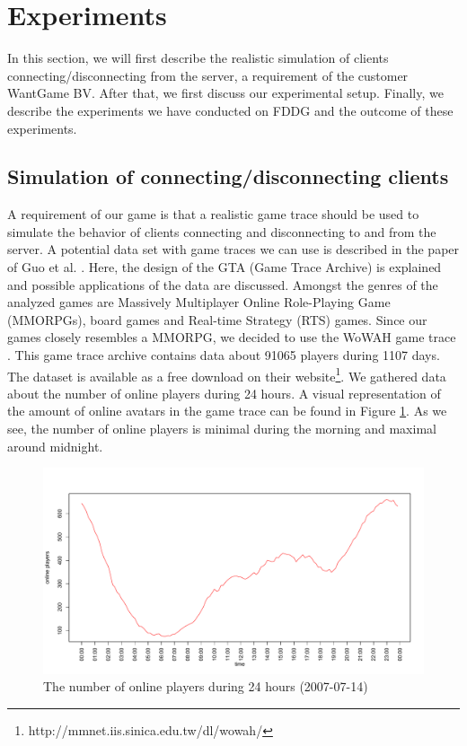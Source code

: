 \section{Experiments}
\label{sec:experiments}
	In this section, we will first describe the realistic simulation of clients connecting/disconnecting from the server, a requirement of the customer WantGame BV. After that, we first discuss our experimental setup. Finally, we describe the experiments we have conducted on FDDG and the outcome of these experiments.
	
\subsection{Simulation of connecting/disconnecting clients}
\label{subsec:simulation_clients}
A requirement of our game is that a realistic game trace should be used to simulate the behavior of clients connecting and disconnecting to and from the server.
A potential data set with game traces we can use is described in the paper of Guo et al. \cite{guo2012game}.
Here, the design of the GTA (Game Trace Archive) is explained and possible applications of the data are discussed.
Amongst the genres of the analyzed games are Massively Multiplayer Online Role-Playing Game (MMORPGs), board games and Real-time Strategy (RTS) games. 
Since our games closely resembles a MMORPG, we decided to use the WoWAH game trace \cite{lee2011world}.
This game trace archive contains data about 91065 players during 1107 days. The dataset is available as a free download on their website\footnote{http://mmnet.iis.sinica.edu.tw/dl/wowah/}.
We gathered data about the number of online players during 24 hours. 
A visual representation of the amount of online avatars in the game trace can be found in Figure \ref{fig:online_players_plot}. As we see, the number of online players is minimal during the morning and maximal around midnight.

\begin{figure}[h!]
  \centering
    \includegraphics[width=\textwidth]{images/online_players_plot}
    
  \caption{The number of online players during 24 hours (2007-07-14)}
  \label{fig:online_players_plot}
\end{figure}

